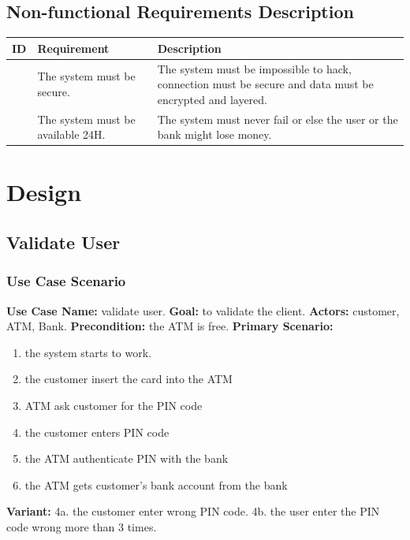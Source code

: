 \documentclass{article}
\newcounter{magicrownumbers}
\newcommand\rownumber{\stepcounter{magicrownumbers}\arabic{magicrownumbers}}
\begin{document}
	\newpage\subsection{Non-functional Requirements Description}
	\setcounter{magicrownumbers}{0}
	\def\arraystretch{2}
	\begin{table}[h!]
		\begin{center}
			\begin{tabularx}{\textwidth}{r|X|X}
				\textbf{ID} & 
				\textbf{Requirement} & 
				\textbf{Description}\\
				\hline
				\rownumber &
				The system must be secure. &
				The system must be impossible to hack, connection must be secure and data must be encrypted and layered.
				\\
				\hline

				\rownumber &
				The system must be available 24H. &
				The system must never fail or else the user or the bank might lose money.
				\\
			
			\end{tabularx}
		\end{center}
	\end{table}

	\newpage\section{Design}
	\newpage\subsection{Validate User}
	\subsubsection{Use Case Scenario}
		\textbf{Use Case Name:}	validate user.
		\newline\textbf{Goal:} to validate the client.
		\newline\textbf{Actors:} customer, ATM, Bank. 	
		\newline\textbf{Precondition:} the ATM is free. 	
		\newline\textbf{Primary Scenario:}	
			\begin{enumerate}[label*=\arabic*.]
				\item the system starts to work.
				\item the customer insert the card into the ATM 
				\item ATM ask customer for the PIN code
				\item the customer enters PIN code
				\item the ATM authenticate PIN with the bank
				\item the ATM gets customer's bank account from the bank
			\end{enumerate}
		\textbf{Variant:}\newline	
			\hspace*{5mm}4a. the customer enter wrong PIN code.\newline
			\hspace*{5mm}4b. the user enter the PIN code wrong more than 3 times.
\end{document}
